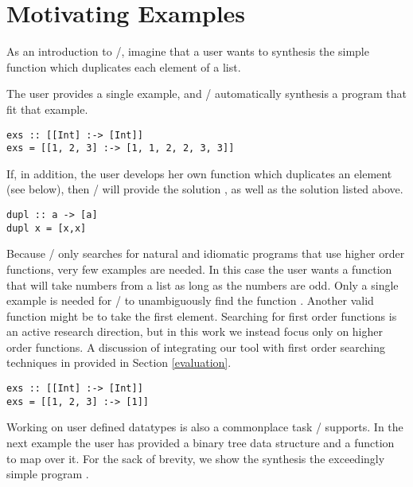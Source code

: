 \section{Motivating Examples} 
\label{examples}


As an introduction to \ourTool/, imagine that a user wants to synthesis the simple  \cite{Osera:2015} function which duplicates each element of a list.


The user provides a single example, and \ourTool/ automatically synthesis a program  that fit that example.

\begin{lstlisting}
exs :: [[Int] :-> [Int]]
exs = [[1, 2, 3] :-> [1, 1, 2, 2, 3, 3]]
\end{lstlisting}

If, in addition, the user develops her own function  which duplicates an element (see below), then \ourTool/ will provide the solution , as well as the solution listed above.

\begin{lstlisting}
dupl :: a -> [a]
dupl x = [x,x]
\end{lstlisting}

Because \ourTool/ only searches for natural and idiomatic programs that use higher order functions, very few examples are needed. In this case the user wants a function that will take numbers from a list as long as the numbers are odd. Only a single example is needed for \ourTool/ to unambiguously find the function . Another valid function might be  to take the first element. Searching for first order functions is an active research direction, but in this work we instead focus only on higher order functions. A discussion of integrating our tool with first order searching techniques in provided in Section \ref{evaluation}.

\begin{lstlisting}
exs :: [[Int] :-> [Int]]
exs = [[1, 2, 3] :-> [1]]
\end{lstlisting}

Working on user defined datatypes is also a commonplace task \ourTool/ supports. In the next example the user has provided a binary tree data structure and a function to map over it. For the sack of brevity, we show the synthesis the exceedingly simple program .

